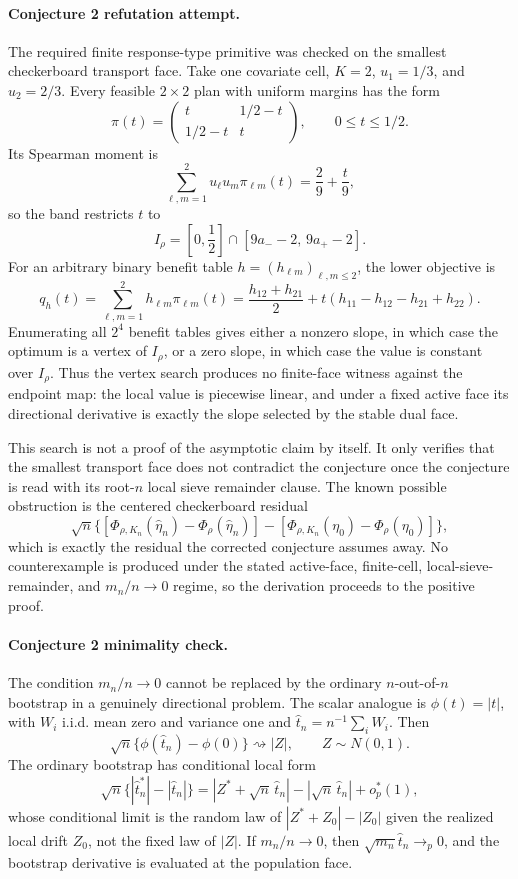 \documentclass[11pt]{article}
\theoremstyle{definition}
\theoremstyle{plain}
\theoremstyle{remark}
\begin{document}
\paragraph{Conjecture 2 refutation attempt.}
The required finite response-type primitive was checked on the smallest checkerboard transport face.  Take one covariate cell, \(K=2\), \(u_1=1/3\), and \(u_2=2/3\).  Every feasible \(2\times2\) plan with uniform margins has the form
\[
\pi(t)=
\begin{pmatrix}
t & 1/2-t\\
1/2-t & t
\end{pmatrix},
\qquad 0\le t\le 1/2.
\]
Its Spearman moment is
\[
\sum_{\ell,m=1}^2u_\ell u_m\pi_{\ell m}(t)=\frac{2}{9}+\frac{t}{9},
\]
so the band restricts \(t\) to
\[
I_\rho=\left[0,\frac12\right]\cap[9a_- -2,\,9a_+ -2].
\]
For an arbitrary binary benefit table \(h=(h_{\ell m})_{\ell,m\le2}\), the lower objective is
\[
q_h(t)=\sum_{\ell,m=1}^2 h_{\ell m}\pi_{\ell m}(t)
=\frac{h_{12}+h_{21}}{2}
+t(h_{11}-h_{12}-h_{21}+h_{22}).
\]
Enumerating all \(2^4\) benefit tables gives either a nonzero slope, in which case the optimum is a vertex of \(I_\rho\), or a zero slope, in which case the value is constant over \(I_\rho\).  Thus the vertex search produces no finite-face witness against the endpoint map: the local value is piecewise linear, and under a fixed active face its directional derivative is exactly the slope selected by the stable dual face.

This search is not a proof of the asymptotic claim by itself.  It only verifies that the smallest transport face does not contradict the conjecture once the conjecture is read with its root-\(n\) local sieve remainder clause.  The known possible obstruction is the centered checkerboard residual
\[
\sqrt n\{[\Phi_{\rho,K_n}(\widehat\eta_n)-\Phi_\rho(\widehat\eta_n)]
-[\Phi_{\rho,K_n}(\eta_0)-\Phi_\rho(\eta_0)]\},
\]
which is exactly the residual the corrected conjecture assumes away.  No counterexample is produced under the stated active-face, finite-cell, local-sieve-remainder, and \(m_n/n\to0\) regime, so the derivation proceeds to the positive proof.

\paragraph{Conjecture 2 minimality check.}
The condition \(m_n/n\to0\) cannot be replaced by the ordinary \(n\)-out-of-\(n\) bootstrap in a genuinely directional problem.  The scalar analogue is \(\phi(t)=|t|\), with \(W_i\) i.i.d. mean zero and variance one and \(\widehat t_n=n^{-1}\sum_iW_i\).  Then
\[
\sqrt n\{\phi(\widehat t_n)-\phi(0)\}\rightsquigarrow |Z|,
\qquad Z\sim N(0,1).
\]
The ordinary bootstrap has conditional local form
\[
\sqrt n\{|\widehat t_n^*|-|\widehat t_n|\}
=|Z^*+\sqrt n\,\widehat t_n|-|\sqrt n\,\widehat t_n|+o_p^*(1),
\]
whose conditional limit is the random law of \(|Z^*+Z_0|-|Z_0|\) given the realized local drift \(Z_0\), not the fixed law of \(|Z|\).  If \(m_n/n\to0\), then \(\sqrt{m_n}\widehat t_n\to_p0\), and the bootstrap derivative is evaluated at the population face.
\end{document}
